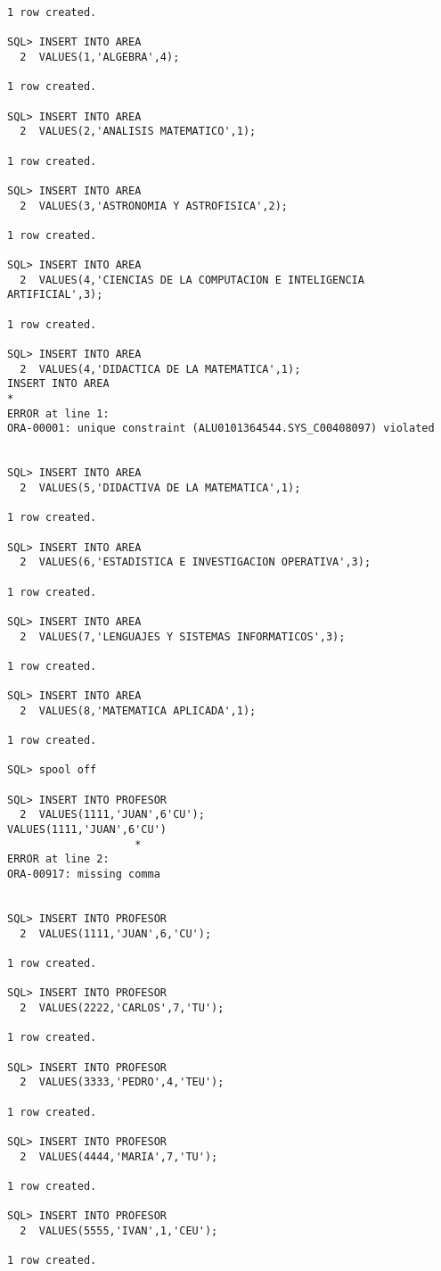 \documentclass[11pt]{report}
\begin{document}
\begin{verbatim}
1 row created.

SQL> INSERT INTO AREA
  2  VALUES(1,'ALGEBRA',4);

1 row created.

SQL> INSERT INTO AREA
  2  VALUES(2,'ANALISIS MATEMATICO',1);

1 row created.

SQL> INSERT INTO AREA
  2  VALUES(3,'ASTRONOMIA Y ASTROFISICA',2);

1 row created.

SQL> INSERT INTO AREA
  2  VALUES(4,'CIENCIAS DE LA COMPUTACION E INTELIGENCIA ARTIFICIAL',3);

1 row created.

SQL> INSERT INTO AREA
  2  VALUES(4,'DIDACTICA DE LA MATEMATICA',1);
INSERT INTO AREA
*
ERROR at line 1:
ORA-00001: unique constraint (ALU0101364544.SYS_C00408097) violated 


SQL> INSERT INTO AREA
  2  VALUES(5,'DIDACTIVA DE LA MATEMATICA',1);

1 row created.

SQL> INSERT INTO AREA
  2  VALUES(6,'ESTADISTICA E INVESTIGACION OPERATIVA',3);

1 row created.

SQL> INSERT INTO AREA
  2  VALUES(7,'LENGUAJES Y SISTEMAS INFORMATICOS',3);

1 row created.

SQL> INSERT INTO AREA
  2  VALUES(8,'MATEMATICA APLICADA',1);

1 row created.

SQL> spool off

SQL> INSERT INTO PROFESOR
  2  VALUES(1111,'JUAN',6'CU');
VALUES(1111,'JUAN',6'CU')
                    *
ERROR at line 2:
ORA-00917: missing comma 


SQL> INSERT INTO PROFESOR
  2  VALUES(1111,'JUAN',6,'CU');

1 row created.

SQL> INSERT INTO PROFESOR
  2  VALUES(2222,'CARLOS',7,'TU');

1 row created.

SQL> INSERT INTO PROFESOR
  2  VALUES(3333,'PEDRO',4,'TEU');

1 row created.

SQL> INSERT INTO PROFESOR
  2  VALUES(4444,'MARIA',7,'TU');

1 row created.

SQL> INSERT INTO PROFESOR
  2  VALUES(5555,'IVAN',1,'CEU');

1 row created.


\end{verbatim}
\end{document}
